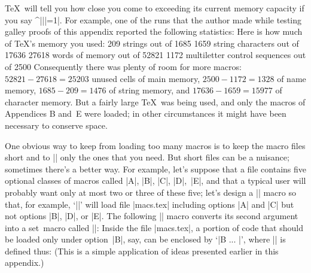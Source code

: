 {{{{\TeX\ will tell you how close you come to exceeding its current
memory capacity if you say ^|\tracingstats||=1|. For example, one of the
runs that the author made while testing galley proofs of this appendix
reported the following statistics:
\begintt
Here is how much of TeX's memory you used:
 209 strings out of 1685
 1659 string characters out of 17636
 27618 words of memory out of 52821
 1172 multiletter control sequences out of 2500
\endtt
Consequently there was plenty of room for more macros: $52821-27618=
25203$ unused cells of main memory, $2500-1172=1328$ of name memory,
$1685-209=1476$ of string memory, and $17636-1659=15977$ of character memory.
But a fairly large \TeX\ was being used, and only the macros of
Appendices B and~E were loaded; in other circumstances it might have
been necessary to conserve space.

One obvious way to keep from loading too many macros is to keep
the macro files short and to || only the ones that you need.
But short files can be a nuisance; sometimes there's a better way.
For example, let's suppose that a file contains five optional classes
of macros called |A|, |B|, |C|, |D|,~|E|, and that a typical user
will probably want only at most two or three of these five; let's
design a |\load| macro so that, for example,
`||'
will load file |macs.tex| including options |A| and |C| but not options
|B|, |D|, or |E|. The following |\load| macro converts its second argument
into a set~macro called |\options|:
\begintt
\def\load#1#2{\let\options=\empty \addoptions#2\end #1 }
\def\addoptions#1{\ifx#1\end \let\next=\relax
  \else\let\\=\relax\edef\options{\options\\#1}%
   \let\next=\addoptions \fi \next}
\endtt
Inside the file |macs.tex|, a portion of code that should be loaded only
under option~|B|, say, can be enclosed by `|\ifoption B ... \fi|', where
|\ifoption| is defined thus:
\begintt
\def\ifoption#1{\def\\##1{\if##1#1\resulttrue\fi}%
  \resultfalse \options \ifresult}
\endtt
(This is a simple application of ideas presented earlier in this appendix.)

}}}}
